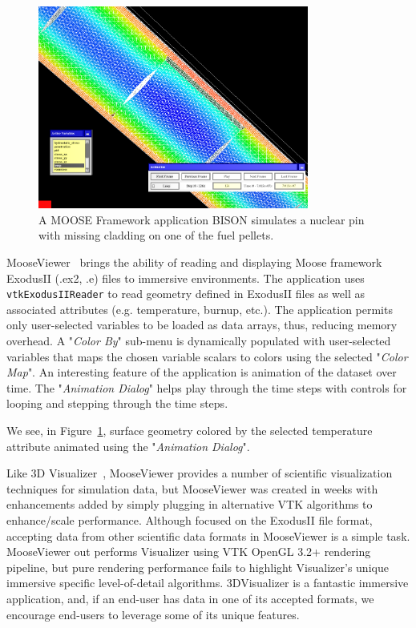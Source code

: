 \begin{figure}[h!]
 \centering
 \includegraphics[width=3.5in]{images/fuelpin.png}
 \caption{A MOOSE Framework application BISON simulates a nuclear pin with missing cladding on one of the fuel pellets.}
 \label{fig:fuelpin}
\end{figure}

MooseViewer~\cite{MooseViewer} brings the ability of reading and displaying Moose framework~\cite{Gaston:2015, MooseFramework} ExodusII (.ex2, .e) files to immersive environments. The application uses \texttt{vtkExodusIIReader} to read geometry defined in ExodusII files as well as associated attributes (e.g. temperature, burnup, etc.). The application permits only user-selected variables to be loaded as data arrays, thus, reducing memory overhead. A "\textit{Color By}" sub-menu is dynamically populated with user-selected variables that maps the chosen variable scalars to colors using the selected "\textit{Color Map}".
An interesting feature of the application is animation of the dataset over time.
The "\textit{Animation Dialog}" helps play through the time steps with controls for looping and stepping through the time steps.

We see, in Figure~\ref{fig:fuelpin}, surface geometry colored by the selected temperature attribute animated using the "\textit{Animation Dialog}".

Like 3D Visualizer~\cite{Billen:2008}, MooseViewer provides a number of scientific visualization techniques for simulation data, but MooseViewer was created in weeks with enhancements added by simply plugging in alternative VTK algorithms to enhance/scale performance.  Although focused on the ExodusII file format, accepting data from other scientific data formats in MooseViewer is a simple task. MooseViewer out performs Visualizer using VTK OpenGL 3.2+ rendering pipeline, but pure rendering performance fails to highlight Visualizer's unique immersive specific level-of-detail algorithms. 3DVisualizer is a fantastic immersive application, and, if an end-user has data in one of its accepted formats, we encourage end-users to leverage some of its unique features.

